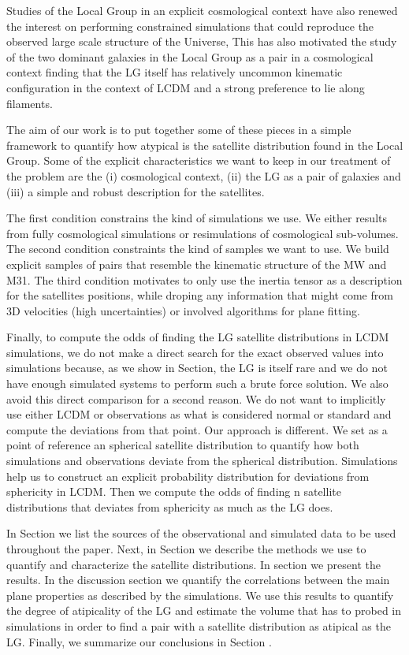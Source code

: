 \documentclass[a4paper,fleqn,usenatbib]{mnras}
\begin{document}
Studies of the Local Group in an explicit cosmological context have
also renewed the interest on performing constrained simulations that
could reproduce the observed large scale structure of the Universe,
This has also motivated the study of the two dominant galaxies in the 
Local Group as a pair in a cosmological context finding that the LG
itself has relatively uncommon kinematic configuration in the context
of LCDM and a strong preference to lie along filaments.


The aim of our work is to put together some of these pieces in a 
simple framework to quantify how atypical is the satellite
distribution found in the Local Group.
Some of the explicit characteristics we want to keep in our treatment
of the problem are the (i) cosmological context, (ii) the LG as a pair
of galaxies and (iii) a simple and robust description for the
satellites. 

The first condition constrains the kind of simulations we use. 
We either results from fully cosmological simulations or resimulations
of cosmological sub-volumes. 
The second condition constraints the kind of samples we want to
use. We build explicit samples of pairs that resemble the kinematic
structure of the MW and M31. 
The third condition motivates to only use the inertia tensor as a
description for the satellites positions, while droping any
information that might come from 3D velocities (high uncertainties) or
involved algorithms for plane fitting.  

Finally, to compute the odds of finding the LG satellite distributions 
in LCDM simulations, we do not make a direct search for the exact
observed values into simulations because, as we show in Section, the
LG is itself rare and we do not have enough simulated systems to
perform such a brute force solution. 
We also avoid this direct comparison for a second reason. 
We do not want to implicitly use either LCDM or observations as what
is considered normal or standard and compute the deviations from that
point. 
Our approach is different. 
We set as a point of reference an spherical satellite
distribution to quantify how both simulations and observations
deviate from the spherical distribution.
Simulations help us to construct an explicit probability distribution
for deviations from sphericity in LCDM.
Then we compute the odds of finding n satellite distributions that
deviates from sphericity as much as the LG does. 

In Section we list the sources of the observational and
simulated data to be used throughout the paper.
Next, in Section we describe the methods we use to quantify and
characterize the satellite distributions.
In section we present the results. 
In the discussion section we quantify the correlations between the main
plane properties as described by the simulations.
We use this results to quantify the degree of atipicality of the LG
and estimate the volume that has to probed in simulations in order to
find a pair with a satellite distribution as atipical as the LG. 
Finally, we summarize our conclusions in Section .
\end{document}
